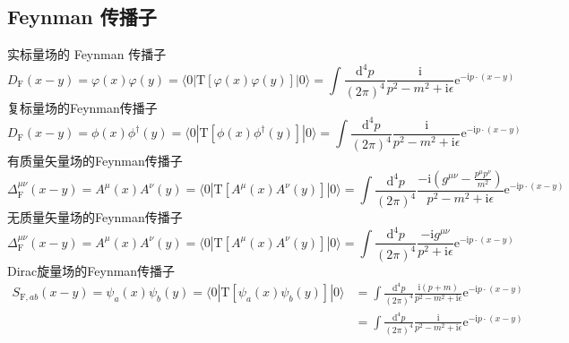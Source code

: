 \subsection{Feynman 传播子}














实标量场的 Feynman 传播子
\begin{equation}
    D_{\mathrm{F}}(x-y)=\varphi (x)\varphi (y)=\langle 0|\mathrm{T}\left[ \varphi (x)\varphi (y) \right] |0\rangle =\int{\frac{\mathrm{d}^4p}{\left( 2\pi \right) ^4}}\frac{\mathrm{i}}{p^2-m^2+\mathrm{i}\epsilon}\mathrm{e}^{-\mathrm{i}p\cdot \left( x-y \right)}
\end{equation}
复标量场的Feynman传播子
\begin{equation}
   D_{\mathrm{F}}(x-y)=\phi (x)\phi ^{\dagger}(y)=\langle 0|\mathrm{T}\left[ \phi (x)\phi ^{\dagger}(y) \right] |0\rangle =\int{\frac{\mathrm{d}^4p}{\left( 2\pi \right) ^4}}\frac{\mathrm{i}}{p^2-m^2+\mathrm{i}\epsilon}\mathrm{e}^{-\mathrm{i}p\cdot \left( x-y \right)}
\end{equation}
有质量矢量场的Feynman传播子
\begin{equation}
   \Delta _{\mathrm{F}}^{\mu \nu}(x-y)=A^{\mu}(x)A^{\nu}(y)=\langle 0|\mathrm{T}\left[ A^{\mu}(x)A^{\nu}(y) \right] |0\rangle =\int{\frac{\mathrm{d}^4p}{\left( 2\pi \right) ^4}}\frac{-\mathrm{i}\left( g^{\mu \nu}-\frac{p^{\mu}p^{\nu}}{m^2} \right)}{p^2-m^2+\mathrm{i}\epsilon}\mathrm{e}^{-\mathrm{i}p\cdot \left( x-y \right)}
\end{equation}
无质量矢量场的Feynman传播子
\begin{equation}
   \Delta _{\mathrm{F}}^{\mu \nu}(x-y)=A^{\mu}(x)A^{\nu}(y)=\langle 0|\mathrm{T}\left[ A^{\mu}(x)A^{\nu}(y) \right] |0\rangle =\int{\frac{\mathrm{d}^4p}{\left( 2\pi \right) ^4}}\frac{-\mathrm{i}g^{\mu \nu}}{p^2+\mathrm{i}\epsilon}\mathrm{e}^{-\mathrm{i}p\cdot \left( x-y \right)}
\end{equation}
Dirac旋量场的Feynman传播子
\begin{equation}
   \begin{aligned}
       S_{\mathrm{F},ab}(x-y)=\psi _a(x)\psi _b(y)=\langle 0|\mathrm{T}\left[ \psi _a(x)\psi _b(y) \right] |0\rangle &=\int{\frac{\mathrm{d}^4p}{\left( 2\pi \right) ^4}}\frac{\mathrm{i}\left( p+m \right)}{p^2-m^2+\mathrm{i}\epsilon}\mathrm{e}^{-\mathrm{i}p\cdot \left( x-y \right)}
       \\
       &=\int{\frac{\mathrm{d}^4p}{\left( 2\pi \right) ^4}}\frac{\mathrm{i}}{p^2-m^2+\mathrm{i}\epsilon}\mathrm{e}^{-\mathrm{i}p\cdot \left( x-y \right)}
   \end{aligned}
\end{equation}

